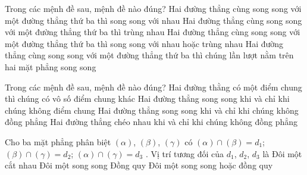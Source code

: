 

\begin{ex}%
	Trong các mệnh  đề sau, mệnh đề nào đúng?
	\choice 
		{Hai  đường thẳng cùng song song với một đường thẳng thứ ba thì song song với nhau}
		{Hai đường thẳng cùng song song với một đường thẳng thứ  ba thì trùng nhau}
		{\True Hai đường thẳng cùng song song với một đường thẳng thứ ba thì song song với nhau hoặc  trùng nhau}
		{Hai đường thẳng cùng song song với một đường thẳng thứ ba thì chúng lần  lượt nằm trên hai mặt phẳng song song}
\end{ex}

\begin{ex}%
	Trong các mệnh đề sau, mệnh đề nào  đúng?
	 \choice
		{Hai  đường thằng có một điểm chung thì chúng có vô số điểm chung khác}
		{Hai đường thẳng song song khi  và chỉ khi chúng không điểm chung}
		{Hai  đường thẳng song song khi và chỉ khi chúng không đồng phẳng}
		{\True Hai đường thẳng chéo nhau khi và chỉ khi chúng không đồng  phẳng}
\end{ex}

\begin{ex}%
	Cho ba mặt phẳng phân biệt $(\alpha)$, $(\beta)$, $(\gamma)$ có $(\alpha)\cap(\beta)=d_1$; $(\beta)\cap(\gamma)=d_2$; $(\alpha)\cap(\gamma)=d_3$ . Vị  trí tương đối của $d_1$, $d_2$, $d_3$ là
	\choice 
		{Đôi một cắt  nhau}
		{Đôi một song  song}
		{Đồng quy} 
		{\True Đôi một  song song hoặc đồng quy}
\end{ex}

